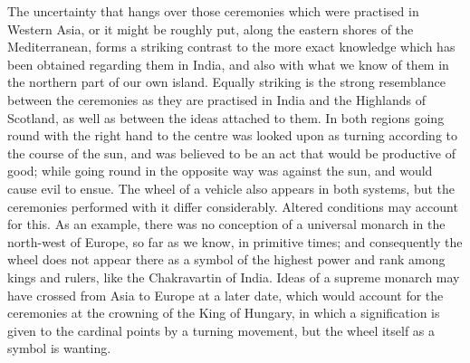 \documentclass[a4paper, 11pt, oneside, polutonikogreek, english]{article}
\begin{document}
The uncertainty that hangs over those ceremonies which were practised in Western Asia, or it might be roughly put, along the eastern shores of the Mediterranean, forms a striking contrast to the more exact knowledge which has been obtained regarding them in India, and also with what we know of them in the northern part of our own island. Equally striking is the strong resemblance between the ceremonies as they are practised in India and the Highlands of Scotland, as well as between the ideas attached to them. In both regions going round with the right hand to the centre was looked upon as turning according to the course of the sun, and was believed to be an act that would be productive of good; while going round in the opposite way was against the sun, and would cause evil to ensue. The wheel of a vehicle also appears in both systems, but the ceremonies performed with it differ considerably. Altered conditions may account for this. As an example, there was no conception of a universal monarch in the north-west of Europe, so far as we know, in primitive times; and consequently the wheel does not appear there as a symbol of the highest power and rank among kings and rulers, like the Chakravartin of India. Ideas of a supreme monarch may have crossed from Asia to Europe at a later date, which would account for the ceremonies at the crowning of the King of Hungary, in which a signification is given to the cardinal points by a turning movement, but the wheel itself as a symbol is wanting.
\end{document}
